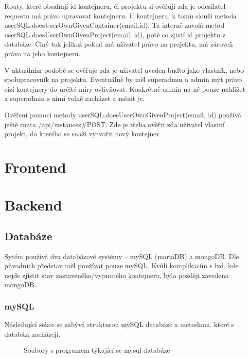 \documentclass[a4paper,oneside,12pt]{report}
\begin{document}
Routy, které obsahují id kontejneru, či projektu si ověřují zda je odesílatel requestu má právo upravovat kontejneru.
U kontejneru, k tomu slouží metoda userSQL.doesUser\linebreak OwnGivenContainer(email,id).
Ta interně zavolá metod userSQL.doesUserOwnGiven\linebreak Project(email, id), poté co zjistí id projektu z databáze.
Činý tak jelikož pokud má uživatel právo na projektu, má zároveň právo na jeho kontejneru.

V aktuálním podobě se ověřuje zda je uživatel uveden buďto jako vlastník, nebo spolupracovník na projektu.
Eventuálně by měl superadmin a admin mýt právo cizí kontejnery do určité míry ovlivňovat.
Konkrétně admin na ně pouze nahlížet a superadmin s nimi volně zacházet a měnit je.

Ověření pomocí metody userSQL.doesUserOwnGivenProject(email, id) používá ještě routa /api/instances\#POST.
Zde je třeba ověřit zda uživatel vlastní projekt, do kterého se snaží vytvořit nový kontejner.

\chapter{Frontend}

\chapter{Backend}


\section{Databáze}

Sytém používá dva databázové systémy -- mySQL (mariaDB) a mongoDB.
Dle původních představ měl používat pouze mySQL.
Kvůli komplikacím s lxd, kde nejde zjistit stav zastaveného/vypnutého kontejneru, byla později zavedena mongoDB.

\subsection{mySQL}
Následující sekce se zabývá strukturou mySQL databáze a metodami, které s databází zacházejí.


\begin{figure}[h]
\caption[Soubory s programem týkající se mysql databáze, vlastni tvorba]{Soubory s programem týkající se mysql databáze}
\label{fig:sqlClasses}
\end{figure}
\end{document}
